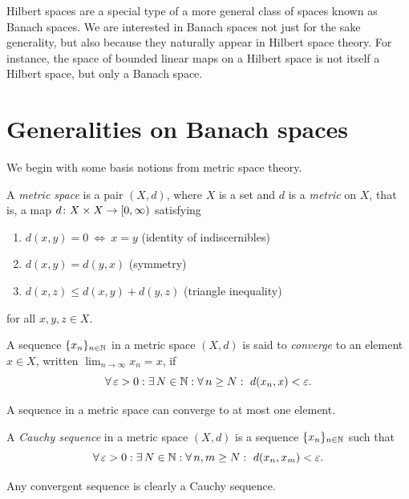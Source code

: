 
Hilbert spaces are a special type of a more general class of spaces
known as Banach spaces. We are interested in Banach spaces not just
for the sake generality, but also because they naturally appear in
Hilbert space theory. For instance, the space of bounded linear maps
on a Hilbert space is not itself a Hilbert space, but only a Banach
space.

\section{Generalities on Banach spaces}

We begin with some basis notions from metric space theory.

\begin{definition}
A \emph{metric space} is a pair $(X,d)$, where $X$
is a set and $d$ is a \emph{metric} on $X$, that is, a map $d\colon
X\times X \to [0,\infty)$ satisfying
\begin{enumerate}[label=(\roman*)]
\item $d(x,y) = 0\ \Leftrightarrow \ x=y$ \hfill (identity of indiscernibles)
\item $d(x,y)=d(y,x)$ \hfill (symmetry)
\item $d(x,z)\leq d(x,y)+d(y,z)$ \hfill (triangle inequality)
\end{enumerate}
for all $x,y,z\in X$.
\end{definition}

\begin{definition}
A sequence $\{x_n\}_{n\in \mathbb{N}}$ in a metric space $(X,d)$ is said to
\emph{converge} to an element $x\in X$, written
$\displaystyle \lim_{n\to \infty}x_n=x$, if
\begin{equation*}
\forall \, \varepsilon > 0 : \exists \, N \in \N : \forall \, n \geq N : \ d(x_n,x)<\varepsilon.
\end{equation*}
\end{definition}

A sequence in a metric space can converge to at most one element.

\begin{definition}
A \emph{Cauchy sequence} in a metric space $(X,d)$ is a sequence $\{x_n\}_{n\in \mathbb{N}}$ such that
\begin{equation*}
\forall \, \varepsilon > 0 : \exists \, N \in \N : \forall \, n,m \geq N : \ d(x_n,x_m)<\varepsilon.
\end{equation*}
\end{definition}
Any convergent sequence is clearly a Cauchy sequence.

